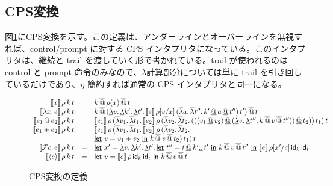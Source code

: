 \documentclass[japanese,draft]{jssst_ppl} %
\begin{document}
\subsection{CPS変換}
図\ref{CPSTrans}にCPS変換を示す。この定義は、アンダーラインとオーバーラインを無視すれば、control/prompt に対する CPS インタプリタになっている。このインタプリタは、継続と trail を渡していく形で書かれている。trail が使われるのは control と prompt 命令のみなので、$\lambda$計算部分については単に trail を引き回しているだけであり、$\eta$-簡約すれば通常の CPS インタプリタと同一になる。
\begin{figure}[h]
\[
\begin{array}{rcl}
  \CPS{x}{\rho}{k}{t} & = & \SApp{\SApp{k}{\rho(x)}}{t}\\
  
  \CPS{\Lam{x}{e}}{\rho}{k}{t} & = & 
      {\SApp{\SApp{k}
                  {\DLamP{v}{\DLam{k'}{\DLam{t'}
                    {\CPS{e}{\rho[\Change{x}{v}]}
           {\SLamP{a}{\SLam{t''}
                 {\DApp{\DApp{k'}{a}}{t''}}}}
                  {t'}}}}}}
        {t}}\\
                  
  \CPS{\App{e_1}{e_2}}{\rho}{k}{t} & = & \CPS{e_1}{\rho}
      {\SLamP{v_1}{\SLam{t_1}{\CPS{e_2}{\rho}
            {\SLamP{v_2}{\SLam{t_2}
                {\DAppP{\DAppP{\DAppP{v_1}{v_2}}
                    {\DLamP{v}{\DLam{t''}
                        {\SApp{\SApp{k}{v}}{t''}}}}}{t_2}}}}{t_1}}}}{t}\\
  
  \CPS{e_1 + e_2}{\rho}{k}{t} & = & \CPSTh{e_1}\, \rho \,
      (\SLamS v_1 .\, \SLamS t_1 .\, \CPSTh{e_2} \, \rho \,
         (\SLamS v_2 .\, \SLamS t_2 .\,\\
  & &  \DLet{v}{v_1+v_2}{\SApp{k}{\SApp{v}{t_2}}})\, t_1)\, t\\
  
  \CPS{\Control{c}{e}}{\rho}{k}{t} & = & \DLet{x'}
      {\DLam{v}{\DLam{k'}{\DLam{t'}
        {\DLet{t''}{\DAppend{t}{\DCons{k'}{t'}}}{\SApp{\SApp{k}{v}}{t''}}}}}}
      {\CPS{e}{\rho[\Change{c}{x'}]}{\Idk}{\Idt}}\\
      
  \CPS{\Prompt{e}}{\rho}{k}{t} & = &
      \DLet{v}{\CPS{e}{\rho}{\Idk}{\Idt}}{\SApp{\SApp{k}{v}}{t}}\\

\end{array}
\]
\caption{CPS変換の定義}
\label{CPSTrans}
\end{figure}
\end{document}
